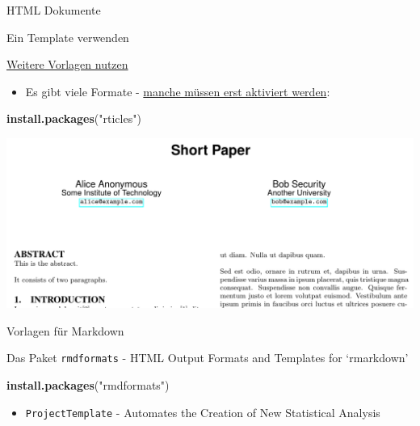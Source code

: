 \documentclass[ignorenonframetext,]{beamer}
\newenvironment{Shaded}{}{}
\newcommand{\KeywordTok}[1]{\textcolor[rgb]{0.00,0.44,0.13}{\textbf{{#1}}}}
\newcommand{\StringTok}[1]{\textcolor[rgb]{0.25,0.44,0.63}{{#1}}}
\newcommand{\NormalTok}[1]{{#1}}
\providecommand{\tightlist}{%
\setlength{\itemsep}{0pt}\setlength{\parskip}{0pt}}
\begin{document}
\begin{frame}[fragile]{HTML Dokumente}
\begin{block}{Ein Template verwenden}
\end{block}

\begin{block}{\href{http://rmarkdown.rstudio.com/developer_document_templates.html}{Weitere
Vorlagen nutzen}}

\begin{itemize}
\tightlist
\item
  Es gibt viele Formate -
  \href{https://blog.rstudio.org/2016/03/21/r-markdown-custom-formats/}{manche
  müssen erst aktiviert werden}:
\end{itemize}

\begin{Shaded}
\begin{Highlighting}[]
\KeywordTok{install.packages}\NormalTok{(}\StringTok{"rticles"}\NormalTok{)}
\end{Highlighting}
\end{Shaded}

\includegraphics{./tex2pdf.9796/d23e4aaa5edff64d1017c3c578a456d45c480cdb.png}

\end{block}

\begin{block}{Vorlagen für Markdown}

Das Paket \texttt{rmdformats} - HTML Output Formats and Templates for
`rmarkdown'

\begin{Shaded}
\begin{Highlighting}[]
\KeywordTok{install.packages}\NormalTok{(}\StringTok{"rmdformats"}\NormalTok{)}
\end{Highlighting}
\end{Shaded}

\begin{itemize}
\tightlist
\item
  \texttt{ProjectTemplate} - Automates the Creation of New Statistical
  Analysis
\end{itemize}


\end{block}
\end{frame}
\end{document}
